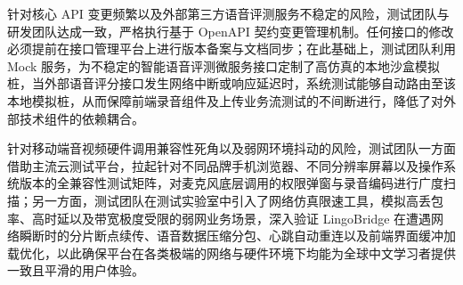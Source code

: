 针对核心 API 变更频繁以及外部第三方语音评测服务不稳定的风险，测试团队与研发团队达成一致，严格执行基于 OpenAPI 契约变更管理机制。任何接口的修改必须提前在接口管理平台上进行版本备案与文档同步；在此基础上，测试团队利用 Mock 服务，为不稳定的智能语音评测微服务接口定制了高仿真的本地沙盒模拟桩，当外部语音评分接口发生网络中断或响应延迟时，系统测试能够自动路由至该本地模拟桩，从而保障前端录音组件及上传业务流测试的不间断进行，降低了对外部技术组件的依赖耦合。

针对移动端音视频硬件调用兼容性死角以及弱网环境抖动的风险，测试团队一方面借助主流云测试平台，拉起针对不同品牌手机浏览器、不同分辨率屏幕以及操作系统版本的全兼容性测试矩阵，对麦克风底层调用的权限弹窗与录音编码进行广度扫描；另一方面，测试团队在测试实验室中引入了网络仿真限速工具，模拟高丢包率、高时延以及带宽极度受限的弱网业务场景，深入验证 LingoBridge 在遭遇网络瞬断时的分片断点续传、语音数据压缩分包、心跳自动重连以及前端界面缓冲加载优化，以此确保平台在各类极端的网络与硬件环境下均能为全球中文学习者提供一致且平滑的用户体验。
